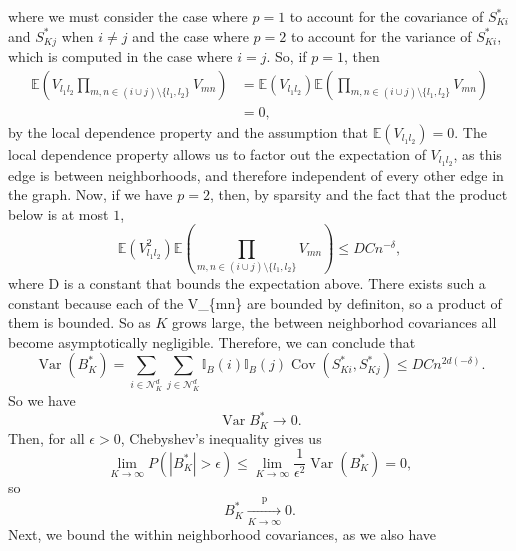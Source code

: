 \documentclass[12pt,twoside]{reedthesis}
\theoremstyle{definition}
\theoremstyle{definition}
\theoremstyle{remark}
\begin{document}
where we must consider the case where \(p = 1\) to account for the
covariance of \(S^{\ast}_{Ki}\) and \(S^{\ast}_{Kj}\) when \(i \neq j\)
and the case where \(p = 2\) to account for the variance of
\(S^{\ast}_{Ki}\), which is computed in the case where \(i = j\). So, if
\(p = 1\), then
\begin{align*}
\mathbb{E}\left( V_{l_1 l_2} \prod_{m,n \in (i \cup j) \setminus \{l_1, l_2\}} V_{mn} \right) &= \mathbb{E}\left( V_{l_1 l_2}\right) \mathbb{E}\left( \prod_{m,n \in (i \cup j) \setminus \{l_1, l_2\}} V_{mn} \right) \\
&= 0,
\end{align*}
by the local dependence property and the assumption that
\(\mathbb{E}(V_{l_1 l_2}) = 0\). The local dependence property allows us
to factor out the expectation of \(V_{l_1 l_2}\), as this edge is
between neighborhoods, and therefore independent of every other edge in
the graph. Now, if we have \(p = 2\), then, by sparsity and the fact
that the product below is at most \(1\),
\begin{equation*}
\mathbb{E}\left( V_{l_1 l_2}^2\right) \mathbb{E}\left( \prod_{m,n \in (i \cup j) \setminus \{l_1, l_2\}} V_{mn} \right) \leq DCn^{-\delta},
\end{equation*}
where D is a constant that bounds the expectation above. There exists
such a constant because each of the V\_\{mn\} are bounded by definiton,
so a product of them is bounded. So as \(K\) grows large, the between
neighborhod covariances all become asymptotically negligible. Therefore,
we can conclude that
\begin{equation}
\operatorname{Var}(B^{\ast}_{K}) = \sum_{i \in \mathcal{N}_{K}^d} \sum_{j \in \mathcal{N}_{K}^d} \mathbb{I}_{B}(i) \mathbb{I}_{B}(j) \operatorname{Cov}(S^{\ast}_{Ki}, S^{\ast}_{Kj}) \leq DCn^{2d(-\delta)}.
\end{equation}
So we have
\begin{equation}
\operatorname{Var}{B^{\ast}_{K}} \to 0.
\end{equation}
Then, for all \(\epsilon > 0\), Chebyshev's inequality gives us
\begin{equation}
  \lim_{K \to \infty} P(|B^{\ast}_{K}| > \epsilon) \leq \lim_{K \to \infty} \frac{1}{\epsilon^2} \operatorname{Var}(B^{\ast}_{K}) = 0,
\end{equation}
so
\begin{equation}
  B^{\ast}_{K} \xrightarrow[K \to \infty]{\text{p}} 0.
\end{equation}
Next, we bound the within neighborhood covariances, as we also have
\end{document}

